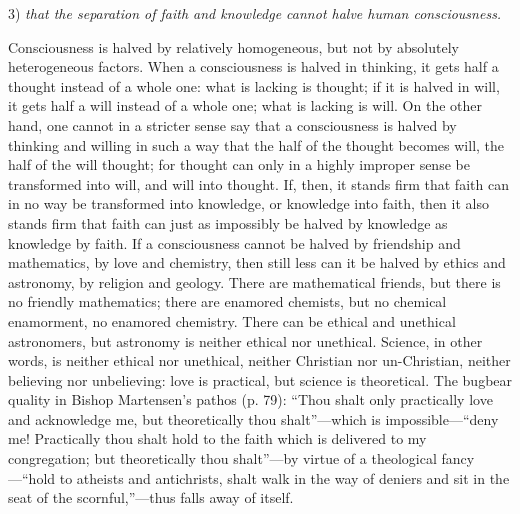 \documentclass[12pt]{book}
\newcommand{\opage}[1]{\marginnote{\footnotesize\textit{[#1]}}}
\begin{document}
3) \emph{that the separation of faith and knowledge cannot halve human consciousness.}

Consciousness is halved by relatively homogeneous, but not by absolutely heterogeneous factors. When a consciousness is halved
\opage{36}\setcounter{footnote}{0}%
in thinking, it gets half a thought instead of a whole one: what is lacking is thought; if it is halved in will, it gets half a will instead of a whole one; what is lacking is will. On the other hand, one cannot in a stricter sense say that a consciousness is halved by thinking and willing in such a way that the half of the thought becomes will, the half of the will thought; for thought can only in a highly improper sense be transformed into will, and will into thought. If, then, it stands firm that faith can in no way be transformed into knowledge, or knowledge into faith, then it also stands firm that faith can just as impossibly be halved by knowledge as knowledge by faith. If a consciousness cannot be halved by friendship and mathematics, by love and chemistry, then still less can it be halved by ethics and astronomy, by religion and geology. There are mathematical friends, but there is no friendly mathematics; there are enamored chemists, but no chemical enamorment, no enamored chemistry. There can be ethical and unethical astronomers, but astronomy is neither ethical nor unethical. Science, in other words, is neither ethical nor unethical, neither Christian nor un-Christian, neither believing nor unbelieving: love is practical, but science is theoretical. The bugbear quality in Bishop Martensen's pathos (p. 79): ``Thou shalt only practically love and acknowledge me, but theoretically thou shalt''---which is impossible---``deny me! Practically thou shalt hold to the faith which is delivered to my congregation; but theoretically thou shalt''---by virtue of a theological fancy---``hold to atheists and antichrists, shalt walk in the way of deniers and sit in the seat of the scornful,''---thus falls away of itself.
\end{document}

